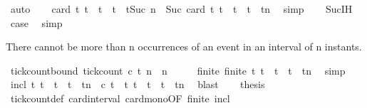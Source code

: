 \begin{isabellebody}
\ auto\isanewline
\ \ \isamarkupfalse%
\ {\isacartoucheopen}card\ {\isacharbraceleft}t{\isachardot}\ t\ {\isasymle}\ t\ {\isasymand}\ t\ {\isacharless}\ tSuc\ n{\isacharparenright}{\isacharbraceright}\ {\isacharequal}\ Suc\ {\isacharparenleft}card\ {\isacharbraceleft}t{\isachardot}\ t\ {\isasymle}\ t\ {\isasymand}\ t\ {\isacharless}\ tn{\isacharbraceright}{\isacharparenright}{\isacartoucheclose}\ \isamarkupfalse%
\ simp\isanewline
\ \ \isamarkupfalse%
\ Suc{\isachardot}IH\ \isamarkupfalse%
\ {\isacharquery}case\ \isamarkupfalse%
\ simp\isanewline
{}\isamarkupfalse%
%
\endisatagproof
{\isafoldproof}%
%
\isadelimproof
%
\endisadelimproof
%
\begin{isamarkuptext}%
There cannot be more than n occurrences of an event in an interval of n instants.%
\end{isamarkuptext}\isamarkuptrue%
\isamarkupfalse%
\ tick{\isacharunderscore}count{\isacharunderscore}bound{\isacharcolon}\ {\isacartoucheopen}tick{\isacharunderscore}count\ c\ t\ n\ {\isasymle}\ n{\isacartoucheclose}\isanewline
%
\isadelimproof
%
\endisadelimproof
%
\isatagproof
{}\isamarkupfalse%
\ {\isacharminus}\isanewline
\ \ \isamarkupfalse%
\ finite{\isacharcolon}\ {\isacartoucheopen}finite\ {\isacharbraceleft}t{\isachardot}\ t\ {\isasymle}\ t\ {\isasymand}\ t\ {\isacharless}\ tn{\isacharbraceright}{\isacartoucheclose}\ \isamarkupfalse%
\ simp\isanewline
\ \ \isamarkupfalse%
\ incl{\isacharcolon}\ {\isacartoucheopen}{\isacharbraceleft}t{\isachardot}\ t\ {\isasymle}\ t\ {\isasymand}\ t\ {\isacharless}\ tn\ {\isasymand}\ c\ t{\isacharbraceright}\ {\isasymsubseteq}\ {\isacharbraceleft}t{\isachardot}\ t\ {\isasymle}\ t\ {\isasymand}\ t\ {\isacharless}\ tn{\isacharbraceright}{\isacartoucheclose}\ \isamarkupfalse%
\ blast\isanewline
\ \ \isamarkupfalse%
\ {\isacharquery}thesis\ \isamarkupfalse%
\ tick{\isacharunderscore}count{\isacharunderscore}def\ card{\isacharunderscore}interval\ card{\isacharunderscore}mono{\isacharbrackleft}OF\ finite\ incl{\isacharbrackright}\ \isamarkupfalse%

\end{isabellebody}
